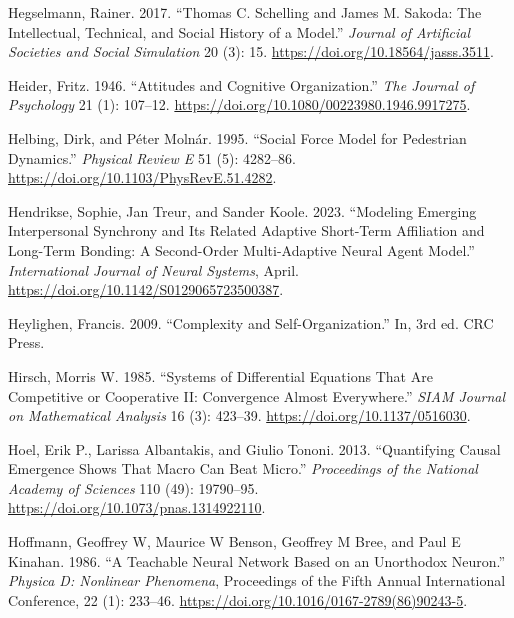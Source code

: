\documentclass[
  a4paper,
  DIV=11,
  numbers=noendperiod,
  oneside]{scrreprt}
\newlength{\cslhangindent}
\newenvironment{CSLReferences}[2] %
 {\begin{list}{}{%
  \setlength{\itemindent}{0pt}
  \setlength{\leftmargin}{0pt}
  \setlength{\parsep}{0pt}
  \ifodd #1
   \setlength{\leftmargin}{\cslhangindent}
   \setlength{\itemindent}{-1\cslhangindent}
  \fi
  \setlength{\itemsep}{#2\baselineskip}}}
 {\end{list}}
\begin{document}
\begin{CSLReferences}{1}{0}
Hegselmann, Rainer. 2017. {``Thomas {C}. {Schelling} and {James M}.
{Sakoda}: {The Intellectual}, {Technical}, and {Social History} of a
{Model}.''} \emph{Journal of Artificial Societies and Social Simulation}
20 (3): 15. \url{https://doi.org/10.18564/jasss.3511}.

Heider, Fritz. 1946. {``Attitudes and {Cognitive Organization}.''}
\emph{The Journal of Psychology} 21 (1): 107--12.
\url{https://doi.org/10.1080/00223980.1946.9917275}.

Helbing, Dirk, and Péter Molnár. 1995. {``Social Force Model for
Pedestrian Dynamics.''} \emph{Physical Review E} 51 (5): 4282--86.
\url{https://doi.org/10.1103/PhysRevE.51.4282}.

Hendrikse, Sophie, Jan Treur, and Sander Koole. 2023. {``Modeling
{Emerging Interpersonal Synchrony} and Its {Related Adaptive Short-Term
Affiliation} and {Long-Term Bonding}: {A Second-Order Multi-Adaptive
Neural Agent Model}.''} \emph{International Journal of Neural Systems},
April. \url{https://doi.org/10.1142/S0129065723500387}.

Heylighen, Francis. 2009. {``Complexity and Self-Organization.''} In,
3rd ed. CRC Press.

Hirsch, Morris W. 1985. {``Systems of {Differential Equations} That Are
{Competitive} or {Cooperative II}: {Convergence Almost Everywhere}.''}
\emph{SIAM Journal on Mathematical Analysis} 16 (3): 423--39.
\url{https://doi.org/10.1137/0516030}.

Hoel, Erik P., Larissa Albantakis, and Giulio Tononi. 2013.
{``Quantifying Causal Emergence Shows That Macro Can Beat Micro.''}
\emph{Proceedings of the National Academy of Sciences} 110 (49):
19790--95. \url{https://doi.org/10.1073/pnas.1314922110}.

Hoffmann, Geoffrey W, Maurice W Benson, Geoffrey M Bree, and Paul E
Kinahan. 1986. {``A Teachable Neural Network Based on an Unorthodox
Neuron.''} \emph{Physica D: Nonlinear Phenomena}, Proceedings of the
{Fifth Annual International Conference}, 22 (1): 233--46.
\url{https://doi.org/10.1016/0167-2789(86)90243-5}.


\end{CSLReferences}
\end{document}
